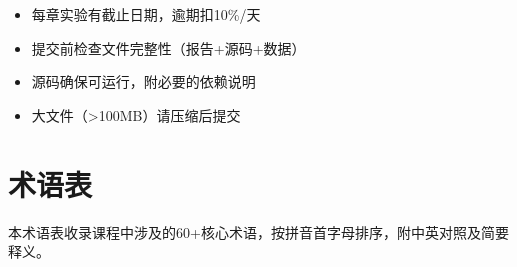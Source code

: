 \begin{notebox}[提交注意]
\begin{itemize}[leftmargin=1em]
  \item 每章实验有截止日期，逾期扣10\%/天
  \item 提交前检查文件完整性（报告+源码+数据）
  \item 源码确保可运行，附必要的依赖说明
  \item 大文件（>100MB）请压缩后提交
\end{itemize}
\end{notebox}


\chapter{术语表}

本术语表收录课程中涉及的60+核心术语，按拼音首字母排序，附中英对照及简要释义。

